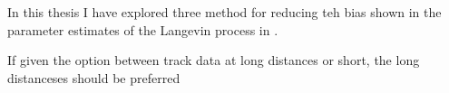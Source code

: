 




























In this thesis I have explored three method for reducing teh bias shown in the parameter estimates of the Langevin process in \parencite{michelot_langevin_2019}. 











If given the option between track data at long distances or short, the long distanceses should be preferred